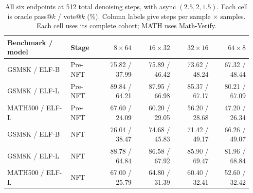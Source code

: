\begin{table}[t]
\caption{All six endpoints at 512 total denoising steps, with async $(2.5,2,1.5)$. Each cell is oracle pass@$k$ / vote@$k$ (\%). Column labels give steps per sample $\times$ samples. Each cell uses its complete cohort; MATH uses Math-Verify.}
\label{tab:budget512}
\centering\small
\setlength{\tabcolsep}{4pt}
\begin{tabular}{llrrrr}
\toprule
Benchmark / model & Stage & $8\times64$ & $16\times32$ & $32\times16$ & $64\times8$ \\
\midrule
GSM8K / ELF-B & Pre-NFT & 75.82 / 37.99 & 75.89 / 46.42 & 73.62 / 48.24 & 67.32 / 48.44 \\
GSM8K / ELF-L & Pre-NFT & 89.84 / 64.21 & 87.95 / 66.98 & 85.37 / 67.17 & 80.21 / 67.09 \\
MATH500 / ELF-L & Pre-NFT & 67.60 / 24.09 & 60.20 / 29.05 & 56.20 / 28.68 & 47.20 / 26.34 \\
GSM8K / ELF-B & NFT & 76.04 / 38.47 & 74.68 / 45.83 & 71.42 / 49.17 & 66.26 / 49.07 \\
GSM8K / ELF-L & NFT & 88.78 / 64.84 & 86.58 / 67.92 & 85.90 / 69.47 & 81.96 / 68.84 \\
MATH500 / ELF-L & NFT & 67.00 / 25.79 & 64.80 / 31.39 & 60.40 / 32.41 & 52.60 / 32.42 \\
\bottomrule
\end{tabular}
\end{table}
